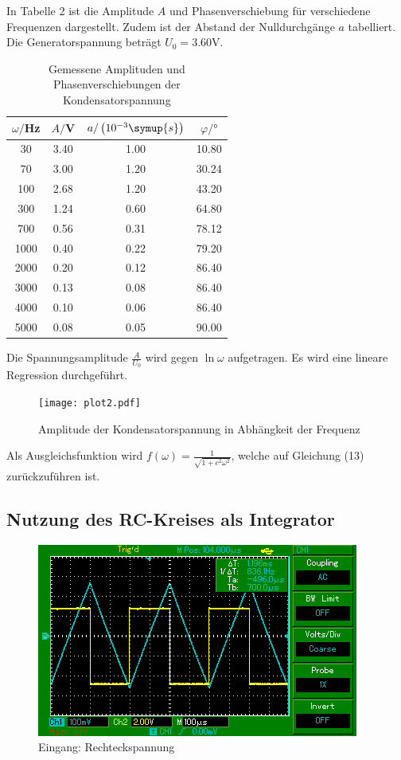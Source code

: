 In Tabelle 2 ist die Amplitude $A$ und Phasenverschiebung für verschiedene Frequenzen dargestellt. Zudem ist der
Abstand der Nulldurchgänge $a$ tabelliert. Die Generatorspannung beträgt $U_0 = 3.60$V.

\begin{table}[H]
  \centering
  \caption{Gemessene Amplituden und Phasenverschiebungen der Kondensatorspannung}
  \label{tab:amplitude}
  \begin{tabular}{c c c c}
    \toprule
    $\omega/$Hz & $A/$V & $a/\left(10^{-3}\symup{s}\right)$ & $\varphi /°$ \\
    \midrule
    30   &  3.40 &    1.00 &  10.80 \\
    70   &  3.00 &    1.20 &  30.24 \\
    100  &  2.68 &    1.20 &  43.20 \\
    300  &  1.24 &    0.60 &  64.80 \\
    700  &  0.56 &    0.31 &  78.12 \\
    1000 &  0.40 &    0.22 &  79.20 \\
    2000 &  0.20 &    0.12 &  86.40 \\
    3000 &  0.13 &    0.08 &  86.40 \\
    4000 &  0.10 &    0.06 &  86.40 \\
    5000 &  0.08 &    0.05 &  90.00 \\
    \bottomrule
  \end{tabular}
\end{table}

Die Spannungsamplitude $\frac{A}{U_0}$ wird gegen $\ln{\omega}$ aufgetragen. Es wird eine lineare
Regression durchgeführt.

\begin{figure}[H]
  \centering
  \texttt{[image: plot2.pdf]}
  \caption{Amplitude der Kondensatorspannung in Abhängkeit der Frequenz}
  \label{fig:amplitude}
\end{figure}

Als Ausgleichsfunktion wird $f(\omega) = \frac{1}{\sqrt{1 + c^2 \omega^2}}$, welche auf Gleichung (13)
zurückzuführen ist.

\subsection{Nutzung des RC-Kreises als Integrator}

\begin{figure}[H]
  \centering
  \includegraphics{MAP001.png}
  \caption{Eingang: Rechteckspannung}
  \label{fig:Rechteckspannung}
\end{figure}

